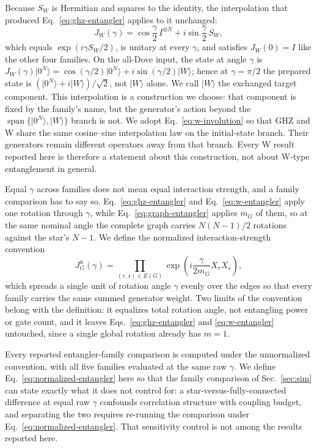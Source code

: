\documentclass[conference,letterpaper,10pt]{IEEEtran}
\newcommand{\ket}[1]{\ensuremath{|#1\rangle}}
\begin{document}
Because $S_W$ is Hermitian and squares to the identity, the interpolation that
produced Eq.~\eqref{eq:ghz-entangler} applies to it unchanged:
\begin{equation}
J_W(\gamma)=\cos\frac{\gamma}{2}\,I^{\otimes N}
+i\sin\frac{\gamma}{2}\,S_W,
\label{eq:w-entangler}
\end{equation}
which equals $\exp(i\gamma S_W/2)$, is unitary at every $\gamma$, and satisfies
$J_W(0)=I$ like the other four families. On the all-Dove input, the state at angle $\gamma$
is
$J_W(\gamma)\ket{0^N}=\cos(\gamma/2)\ket{0^N}+i\sin(\gamma/2)\ket{W}$; hence at
$\gamma=\pi/2$ the prepared state is $(\ket{0^N}+i\ket{W})/\sqrt{2}$, not
$\ket{W}$ alone. We call $\ket{W}$ the exchanged target component. This
interpolation is a construction we choose: that component is fixed by the
family's name, but the generator's action beyond the
$\operatorname{span}\{\ket{0^N},\ket{W}\}$ branch is not. We adopt
Eq.~\eqref{eq:w-involution} so that GHZ and W share the same cosine--sine
interpolation law on the initial-state branch. Their generators remain different
operators away from that branch. Every W result reported here is therefore a
statement about this construction, not about W-type entanglement in general.

Equal $\gamma$ across families does not mean equal interaction strength, and a
family comparison has to say so. Eq.~\eqref{eq:ghz-entangler} and
Eq.~\eqref{eq:w-entangler} apply one rotation through $\gamma$, while
Eq.~\eqref{eq:graph-entangler} applies $m_G$ of them, so at the same nominal
angle the complete graph carries $N(N-1)/2$ rotations against the star's $N-1$.
We define the normalized interaction-strength convention
\begin{equation}
J^{\mathrm{n}}_G(\gamma)=\prod_{(r,s)\in E(G)}
\exp\!\left(i\frac{\gamma}{2m_G}X_rX_s\right),
\label{eq:normalized-entangler}
\end{equation}
which spreads a single unit of rotation angle $\gamma$ evenly over the edges so
that every family carries the same summed generator weight. Two limits of the
convention belong with the definition: it equalizes total rotation angle, not
entangling power or gate count, and it leaves Eqs.~\eqref{eq:ghz-entangler} and
\eqref{eq:w-entangler} untouched, since a single global rotation already has
$m=1$.

Every reported entangler-family comparison is computed under the unnormalized
convention, with all five families evaluated at the same raw $\gamma$. We define
Eq.~\eqref{eq:normalized-entangler} here so that the family comparison of
Sec.~\ref{sec:sim} can state exactly what it does not control for: a star-versus-fully-connected
difference at equal raw $\gamma$ confounds correlation structure with coupling
budget, and separating the two requires re-running the comparison under
Eq.~\eqref{eq:normalized-entangler}. That sensitivity control is not among the
results reported here.
\end{document}
